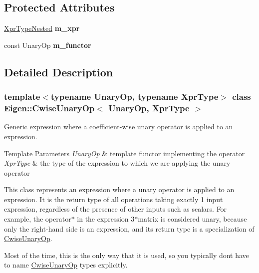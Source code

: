 \subsection*{Protected Attributes}
\begin{DoxyCompactItemize}
\item 
\mbox{\label{class_eigen_1_1_cwise_unary_op_a9dd0fd407963d42271dd2d2da9708a15}} 
\mbox{\hyperlink{struct_eigen_1_1internal_1_1true__type}{Xpr\+Type\+Nested}} {\bfseries m\+\_\+xpr}
\item 
\mbox{\label{class_eigen_1_1_cwise_unary_op_a92344c00a6ef342fd3e53713a0d5391f}} 
const Unary\+Op {\bfseries m\+\_\+functor}
\end{DoxyCompactItemize}


\subsection{Detailed Description}
\subsubsection*{template$<$typename Unary\+Op, typename Xpr\+Type$>$\newline
class Eigen\+::\+Cwise\+Unary\+Op$<$ Unary\+Op, Xpr\+Type $>$}

Generic expression where a coefficient-\/wise unary operator is applied to an expression. 


\begin{DoxyTemplParams}{Template Parameters}
{\em Unary\+Op} & template functor implementing the operator \\
\hline
{\em Xpr\+Type} & the type of the expression to which we are applying the unary operator\\
\hline
\end{DoxyTemplParams}
This class represents an expression where a unary operator is applied to an expression. It is the return type of all operations taking exactly 1 input expression, regardless of the presence of other inputs such as scalars. For example, the operator$\ast$ in the expression 3$\ast$matrix is considered unary, because only the right-\/hand side is an expression, and its return type is a specialization of \mbox{\hyperlink{class_eigen_1_1_cwise_unary_op}{Cwise\+Unary\+Op}}.

Most of the time, this is the only way that it is used, so you typically don\textquotesingle{}t have to name \mbox{\hyperlink{class_eigen_1_1_cwise_unary_op}{Cwise\+Unary\+Op}} types explicitly.

